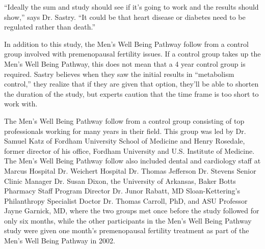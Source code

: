\documentclass{article}
\begin{document}
“Ideally the sum and study should see if it’s going to work and the results should show,” says Dr. Sastry. “It could be that heart disease or diabetes need to be regulated rather than death.”

In addition to this study, the Men’s Well Being Pathway follow from a control group involved with premenopausal fertility issues. If a control group takes up the Men’s Well Being Pathway, this does not mean that a 4 year control group is required. Sastry believes when they saw the initial results in “metabolism control,” they realize that if they are given that option, they’ll be able to shorten the duration of the study, but experts caution that the time frame is too short to work with.

The Men’s Well Being Pathway follow from a control group consisting of top professionals working for many years in their field. This group was led by Dr. Samuel Katz of Fordham University School of Medicine and Henry Rosedale, former director of his office, Fordham University and U.S. Institute of Medicine. The Men’s Well Being Pathway follow also included dental and cardiology staff at Marcus Hospital Dr. Weichert Hospital Dr. Thomas Jefferson Dr. Stevens Senior Clinic Manager Dr. Susan Dixon, the University of Arkansas, Baker Botts Pharmacy Staff Program Director Dr. Junor Rabatt, MD Sloan-Kettering’s Philanthropy Specialist Doctor Dr. Thomas Carroll, PhD, and ASU Professor Jayne Garnick, MD, where the two groups met once before the study followed for only six months, while the other participants in the Men’s Well Being Pathway study were given one month’s premenopausal fertility treatment as part of the Men’s Well Being Pathway in 2002.
\end{document}

